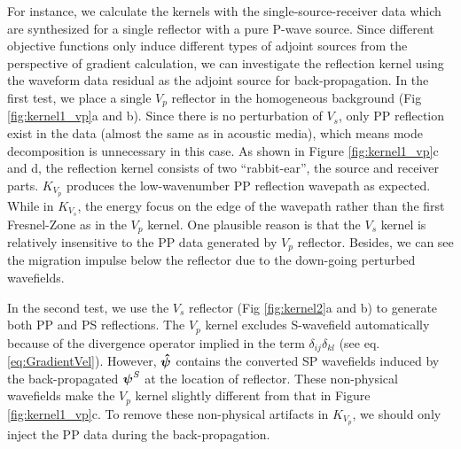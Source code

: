 For instance, we calculate the kernels with the single-source-receiver data
which are synthesized for a single reflector with a pure P-wave source.
Since different objective functions only induce different types of adjoint
sources from the perspective of gradient calculation, we can investigate the reflection kernel 
using the waveform data residual as the adjoint source for back-propagation.
In the first test, we place a single $V_p$ reflector in the homogeneous background (Fig \ref{fig:kernel1_vp}a and b). 
Since there is no perturbation of $V_s$, only PP reflection exist in the data (almost
the same as in acoustic media), which means mode decomposition is unnecessary in this
case.
As shown in Figure \ref{fig:kernel1_vp}c and d, the reflection kernel consists of two ``rabbit-ear'', the
source and receiver parts. $K_{V_p}$ produces the low-wavenumber PP reflection
wavepath as expected.
While in $K_{V_s}$, the energy focus on the edge of the wavepath rather than the first Fresnel-Zone as in the $V_p$ kernel.
One plausible reason is that the $V_s$ kernel is relatively insensitive to the PP data generated by $V_p$ reflector.
Besides, we can see the migration impulse below the reflector due to the down-going perturbed wavefields.


In the second test, we use the $V_s$ reflector (Fig \ref{fig:kernel2}a and b) to generate both PP
and PS reflections.
The $V_p$ kernel excludes S-wavefield automatically because of the divergence operator 
implied in the term $\delta_{ij}\delta_{kl}$ (see eq. \eqref{eq:GradientVel}). 
However, $\boldsymbol{{}\hat\psi}$ contains the converted SP wavefields 
induced by the back-propagated  $\boldsymbol{{}\psi}^S$ at the location of reflector.
These non-physical wavefields make the $V_p$ kernel slightly different from that in Figure \ref{fig:kernel1_vp}c.
To remove these non-physical artifacts in $K_{V_p}$, we should only inject the PP data during the
back-propagation. 

